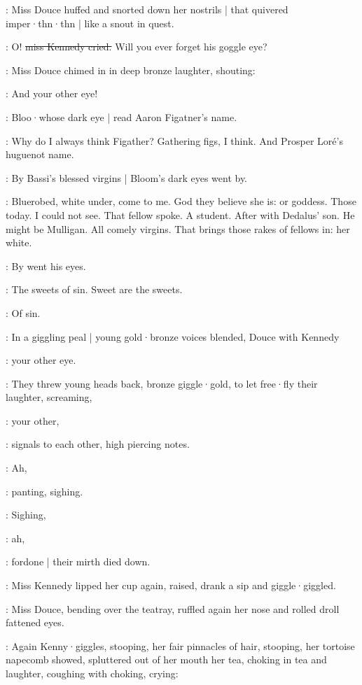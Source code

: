 :
Miss Douce huffed and snorted down her nostrils |
that quivered imper·thn·thn |
like a snout in quest.

\MissK:
O!
\stage{[shrieking]}
\sout{miss Kennedy cried.}
Will you ever forget his goggle eye?

:
Miss Douce chimed in in deep bronze laughter,
shouting:

\MissD:
And your other eye!

:
Bloo·whose dark eye |
read Aaron Figatner's name.

\BloomIntB:
Why do I always think Figather?
Gathering figs,
I think.
And Prosper Loré's huguenot name.

:
By Bassi's blessed virgins |
Bloom's dark eyes went by.

\BloomIntB:
Bluerobed,
white under,
come to me.
God they believe she is:
or goddess.
Those today.
I could not see.
That fellow spoke.
A student.
After with Dedalus' son.
He might be Mulligan.
All comely virgins.
That brings those rakes of fellows in:
her white.

:
By went his eyes.

\BloomIntB:
The sweets of sin.
Sweet are the sweets.

:
Of sin.

:
In a giggling peal |
young gold·bronze voices blended,
Douce with Kennedy

\MissesDK:
your other eye.

:
They threw young heads back,
bronze giggle·gold,
to let free·fly their laughter,
screaming,

\MissesDK:
your other,

:
signals to each other,
high piercing notes.

\MissesDK:
Ah,

:
panting,
sighing.

:
Sighing,

\MissesDK:
ah,

:
fordone |
their mirth died down.

:
Miss Kennedy lipped her cup again,
raised,
drank a sip and giggle·giggled.

:
Miss Douce,
bending over the teatray,
ruffled again her nose
and rolled droll fattened eyes.

:
Again Kenny·giggles,
stooping,
her fair pinnacles of hair,
stooping,
her tortoise napecomb showed,
spluttered out of her mouth her tea,
choking in tea and laughter,
coughing with choking,
crying:

